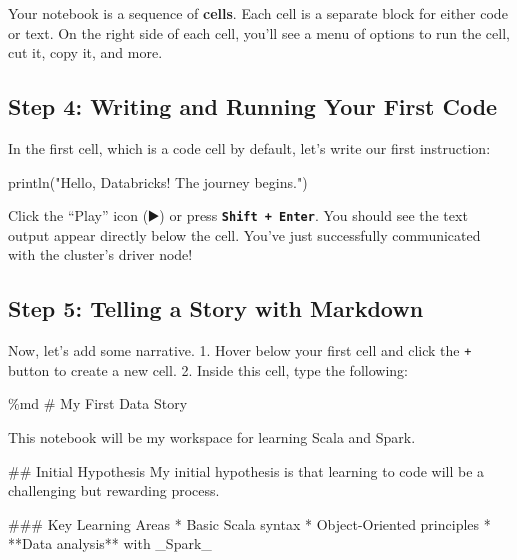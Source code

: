 \documentclass[
  letterpaper,
  DIV=11,
  numbers=noendperiod]{scrreprt}
\newenvironment{Shaded}{\begin{snugshade}}{\end{snugshade}}
\newcommand{\FunctionTok}[1]{\textcolor[rgb]{0.28,0.35,0.67}{#1}}
\newcommand{\NormalTok}[1]{\textcolor[rgb]{0.00,0.23,0.31}{#1}}
\newcommand{\OperatorTok}[1]{\textcolor[rgb]{0.37,0.37,0.37}{#1}}
\newcommand{\SpecialStringTok}[1]{\textcolor[rgb]{0.13,0.47,0.30}{#1}}
\newcommand{\StringTok}[1]{\textcolor[rgb]{0.13,0.47,0.30}{#1}}
\begin{document}
Your notebook is a sequence of \textbf{cells}. Each cell is a separate
block for either code or text. On the right side of each cell, you'll
see a menu of options to run the cell, cut it, copy it, and more.

\subsection*{Step 4: Writing and Running Your First
Code}\label{step-4-writing-and-running-your-first-code}

In the first cell, which is a code cell by default, let's write our
first instruction:

\begin{Shaded}
\begin{Highlighting}[]
\FunctionTok{println}\OperatorTok{(}\StringTok{"Hello, Databricks! The journey begins."}\OperatorTok{)}
\end{Highlighting}
\end{Shaded}

Click the ``Play'' icon (▶️) or press \textbf{\texttt{Shift\ +\ Enter}}.
You should see the text output appear directly below the cell. You've
just successfully communicated with the cluster's driver node!

\subsection*{Step 5: Telling a Story with
Markdown}\label{step-5-telling-a-story-with-markdown}

Now, let's add some narrative. 1. Hover below your first cell and click
the \texttt{+} button to create a new cell. 2. Inside this cell, type
the following:

\begin{Shaded}
\begin{Highlighting}[]
\NormalTok{\%md}
\FunctionTok{\# My First Data Story}

\NormalTok{This notebook will be my workspace for learning Scala and Spark.}

\FunctionTok{\#\# Initial Hypothesis}
\NormalTok{My initial hypothesis is that learning to code will be a challenging but rewarding process.}

\FunctionTok{\#\#\# Key Learning Areas}
\SpecialStringTok{* }\NormalTok{Basic Scala syntax}
\SpecialStringTok{* }\NormalTok{Object{-}Oriented principles}
\SpecialStringTok{* }\NormalTok{**Data analysis** with \_Spark\_}
\end{Highlighting}
\end{Shaded}
\end{document}
